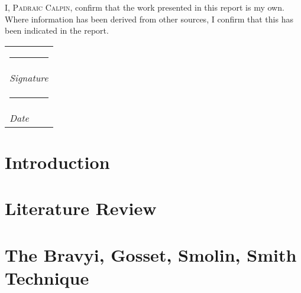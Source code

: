\documentclass[11pt,a4paper,twoside]{report}
\theoremstyle{plain}%
\theoremstyle{definition}
\theoremstyle{remark}
\begin{document}

\restoregeometry 
\pagestyle{fancy}  %
\fancyhead{} %
\fancyhead[RO,LE]{\thepage} %
\fancyhead[LO]{\slshape\rightmark}
\cfoot{}
\makeatletter
\renewcommand{\chaptermark}[1]{%
  \markboth{}{\MakeUppercase{%
    \ifnum\c@secnumdepth>\m@ne \thechapter. \ \fi #1}}%
}
\makeatother
\begin{abstract}
   
\end{abstract}
\tableofcontents
\pagebreak
\newcommand\Declaration[1]{
\thispagestyle{plain}
    \null\vfil
{\normalsize #1}
\vfil\vfil\null
}
\newcommand{\namesigdate}[2][5cm]{%
  \begin{tabular}{@{}p{#1}@{}}
    #2 \\[\normalbaselineskip] \hrule \\[0pt]
    {\small \textit{Signature}} \\[\normalbaselineskip] \hrule \\[0pt]
    {\small \textit{Date}}
  \end{tabular}
}
\Declaration{
I, \textsc{Padraic Calpin}, confirm that the work presented in this report is
my own.
Where information has been derived from other sources, I confirm that this has been
indicated in the report.

\begin{flushright}
  \namesigdate[2.5in]{}
\end{flushright}
}
\chapter{Introduction}\label{chap:intro}

\chapter{Literature Review}\label{chap:litreview}

\chapter{The Bravyi, Gosset, Smolin, Smith Technique}\label{chap:bssg}

\end{document}
